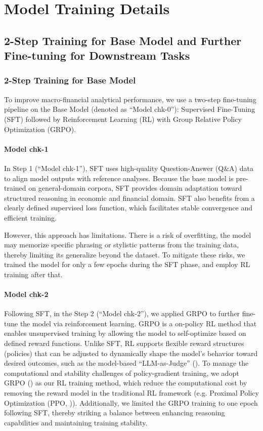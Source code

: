 \newcommand{\prompttag}[1]{\textcolor{blue}{\texttt{<|#1|>}}}

\section{Model Training Details}\label{ch2:sec:training}

\subsection*{2-Step Training for Base Model and Further Fine-tuning for Downstream Tasks}

\subsubsection*{2-Step Training for Base Model}
To improve macro-financial analytical performance, we use a two-step fine-tuning pipeline on the Base Model (denoted as ``Model chk-0''): Supervised Fine-Tuning (SFT) followed by Reinforcement Learning (RL) with Group Relative Policy Optimization (GRPO).

\paragraph*{Model chk-1}
In Step 1 (``Model chk-1''), SFT uses high-quality Question-Answer (Q\&A) data to align model outputs with reference analyses. Because the base model is pre-trained on general-domain corpora, SFT provides domain adaptation toward structured reasoning in economic and financial domain. SFT also benefits from a clearly defined supervised loss function, which facilitates stable convergence and efficient training.

However, this approach has limitations. There is a risk of overfitting, the model may memorize specific phrasing or stylistic patterns from the training data, thereby limiting its generalize beyond the dataset. To mitigate these risks, we trained the model for only a few epochs during the SFT phase, and employ RL training after that. 

\paragraph*{Model chk-2}
Following SFT, in the Step 2 (``Model chk-2''), we applied GRPO to further fine-tune the model via reinforcement learning. GRPO is a on-policy RL method that enables unsupervised training by allowing the model to self-optimize based on defined reward functions. Unlike SFT, RL supports flexible reward structures (policies) that can be adjusted to dynamically shape the model's behavior toward desired outcomes, such as the model-based ``LLM-as-Judge'' (\cite{zheng2024judging}). To manage the computational and stability challenges of policy-gradient training, we adopt GRPO (\cite{shao2024deepseekmath}) as our RL training method, which reduce the computational cost by removing the reward model in the traditional RL framework (e.g. Proximal Policy Optimization (PPO, \cite{schulman2017proximal})). Additionally, we limited the GRPO training to one epoch following SFT, thereby striking a balance between enhancing reasoning capabilities and maintaining training stability.


